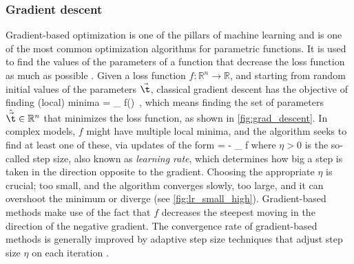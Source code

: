 \subsubsection{Gradient descent}
\label{subsubsec:grad_descent}
Gradient-based optimization is one of the pillars of machine learning \citep{bottou_optimization_2018} and is one of the most common optimization algorithms for parametric functions. It is used to find the values of the parameters of a function that decrease the loss function as much as possible \citep{chandra_gradient_2022,ruder_overview_2016}. Given a loss function $f : \mathbb{R}^n \rightarrow \mathbb {R}$, and starting from random initial values of the parameters $\vec{\t}$, classical gradient descent has the objective of finding (local) minima
\be
\label{eq:4.10}
\hat{\vec{\t}} = \argmin_{\vec{\t}} f(\vec{\t}) \,,
\ee
which means finding the set of parameters $\hat{\vec{\t}} \in \mathbb{R}^n$ that minimizes the loss function, as shown in \cref{fig:grad_descent}. In complex models, $f$ might have multiple local minima, and the algorithm seeks to find at least one of these, via updates of the form
\be
\label{eq:4.11}
\D \vec{\t} = - \eta \va{\nabla}_{\va{\t}} f
\ee
where $\eta > 0$ is the so-called step size, also known as \emph{learning rate}, which determines how big a step is taken in the direction opposite to the gradient. Choosing the appropriate $\eta$ is crucial; too small, and the algorithm converges slowly, too large, and it can overshoot the minimum or diverge (see \cref{fig:lr_small_high}). Gradient-based methods make use of the fact that $f$ decreases the steepest moving in the direction of the negative gradient. The convergence rate of gradient-based methods is generally improved by adaptive step size techniques that adjust step size $\eta$ on each iteration \citep{duchi_adaptive_2011,schaul_no_2013,kingma_adam_2017}.

